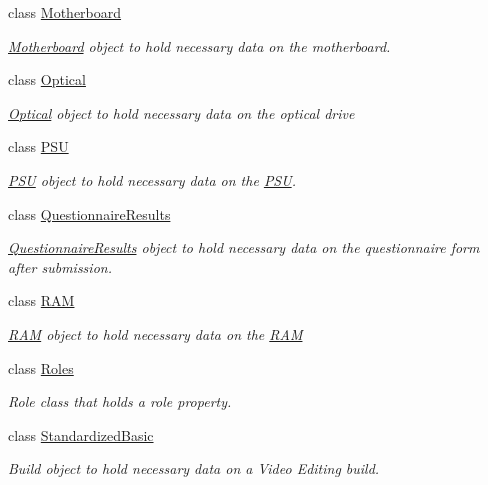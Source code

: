 \begin{DoxyCompactItemize}
class \hyperlink{class_business_objects_1_1_motherboard}{Motherboard}
\begin{DoxyCompactList}\small\item\em \hyperlink{class_business_objects_1_1_motherboard}{Motherboard} object to hold necessary data on the motherboard. \end{DoxyCompactList}\item 
class \hyperlink{class_business_objects_1_1_optical}{Optical}
\begin{DoxyCompactList}\small\item\em \hyperlink{class_business_objects_1_1_optical}{Optical} object to hold necessary data on the optical drive \end{DoxyCompactList}\item 
class \hyperlink{class_business_objects_1_1_p_s_u}{P\+SU}
\begin{DoxyCompactList}\small\item\em \hyperlink{class_business_objects_1_1_p_s_u}{P\+SU} object to hold necessary data on the \hyperlink{class_business_objects_1_1_p_s_u}{P\+SU}. \end{DoxyCompactList}\item 
class \hyperlink{class_business_objects_1_1_questionnaire_results}{Questionnaire\+Results}
\begin{DoxyCompactList}\small\item\em \hyperlink{class_business_objects_1_1_questionnaire_results}{Questionnaire\+Results} object to hold necessary data on the questionnaire form after submission. \end{DoxyCompactList}\item 
class \hyperlink{class_business_objects_1_1_r_a_m}{R\+AM}
\begin{DoxyCompactList}\small\item\em \hyperlink{class_business_objects_1_1_r_a_m}{R\+AM} object to hold necessary data on the \hyperlink{class_business_objects_1_1_r_a_m}{R\+AM} \end{DoxyCompactList}\item 
class \hyperlink{class_business_objects_1_1_roles}{Roles}
\begin{DoxyCompactList}\small\item\em Role class that holds a role property. \end{DoxyCompactList}\item 
class \hyperlink{class_business_objects_1_1_standardized_basic}{Standardized\+Basic}
\begin{DoxyCompactList}\small\item\em Build object to hold necessary data on a Video Editing build. \end{DoxyCompactList}\item 

\end{DoxyCompactItemize}
